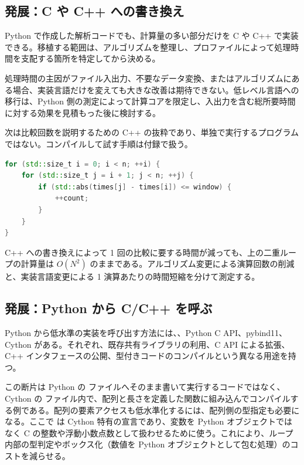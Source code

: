 \subsection{発展：C や C++ への書き換え}

Python で作成した解析コードでも、計算量の多い部分だけを C や C++ で実装できる。移植する範囲は、アルゴリズムを整理し、プロファイルによって処理時間を支配する箇所を特定してから決める。

処理時間の主因がファイル入出力、不要なデータ変換、またはアルゴリズムにある場合、実装言語だけを変えても大きな改善は期待できない。低レベル言語への移行は、Python 側の測定によって計算コアを限定し、入出力を含む総所要時間に対する効果を見積もった後に検討する。

次は比較回数を説明するための C++ の抜粋であり、単独で実行するプログラムではない。コンパイルして試す手順は付録で扱う。

\begin{lstlisting}[language=C++]
for (std::size_t i = 0; i < n; ++i) {
    for (std::size_t j = i + 1; j < n; ++j) {
        if (std::abs(times[j] - times[i]) <= window) {
            ++count;
        }
    }
}
\end{lstlisting}

C++ への書き換えによって 1 回の比較に要する時間が減っても、上の二重ループの計算量は $O(N^2)$ のままである。アルゴリズム変更による演算回数の削減と、実装言語変更による 1 演算あたりの時間短縮を分けて測定する。

\subsection{発展：Python から C/C++ を呼ぶ}

Python から低水準の実装を呼び出す方法には、、Python C API、pybind11、Cython がある。それぞれ、既存共有ライブラリの利用、C API による拡張、C++ インタフェースの公開、型付きコードのコンパイルという異なる用途を持つ。

この断片は Python の  ファイルへそのまま書いて実行するコードではなく、Cython の  ファイル内で、配列と長さを定義した関数に組み込んでコンパイルする例である。配列の要素アクセスも低水準化するには、配列側の型指定も必要になる。ここで  は Cython 特有の宣言であり、変数を Python オブジェクトではなく C の整数や浮動小数点数として扱わせるために使う。これにより、ループ内部の型判定やボックス化（数値を Python オブジェクトとして包む処理）のコストを減らせる。

